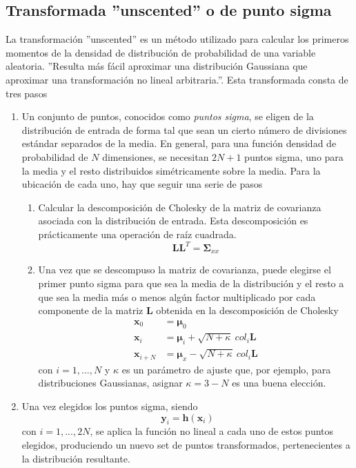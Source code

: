 \subsection{Transformada ''unscented'' o de punto sigma}
La transformación ''unscented''\cite{julier2000}\cite{wan2000} es un método utilizado para calcular los primeros momentos de la densidad de distribución de probabilidad de una variable aleatoria. ''Resulta más fácil aproximar una distribución Gaussiana que aproximar una transformación no lineal arbitraria.''\cite{uhlmann1994}. Esta transformada consta de tres pasos
\begin{enumerate}
    \item Un conjunto de puntos, conocidos como \textit{puntos sigma}, se eligen de la distribución de entrada de forma tal que sean un cierto número de divisiones estándar separados de la media. En general, para una función densidad de probabilidad de $N$ dimensiones, se necesitan $2N + 1$ puntos sigma, uno para la media y el resto distribuidos simétricamente sobre la media. Para la ubicación de cada uno, hay que seguir una serie de pasos
    \begin{enumerate}
        \item Calcular la descomposición de Cholesky de la matriz de covarianza asociada con la distribución de entrada. Esta descomposición es prácticamente una operación de raíz cuadrada.
        \begin{equation}
            \bm{L}\bm{L}^T = \bm{\Sigma}_{xx}
        \end{equation}
        \item Una vez que se descompuso la matriz de covarianza, puede elegirse el primer punto sigma para que sea la media de la distribución y el resto a que sea la media más o menos algún factor multiplicado por cada componente de la matriz $\bm{L}$ obtenida en la descomposición de Cholesky
        \begin{align}
            \bm{x}_0 &= \bm{\mu}_0 \\
            \bm{x}_i &= \bm{\mu}_i + \sqrt{N+\kappa}\ col_i\bm{L} \\
            \bm{x}_{i+N} &= \bm{\mu}_x - \sqrt{N+\kappa}\ col_i\bm{L}
        \end{align}
        con $i = 1, ..., N$ y $\kappa$ es un parámetro de ajuste que, por ejemplo, para distribuciones Gaussianas, asignar $\kappa = 3 - N$ es una buena elección.
    \end{enumerate}
    \item Una vez elegidos los puntos sigma, siendo
    \begin{equation}
        \bm{y}_i = \bm{h}(\bm{x}_i)
    \end{equation}
    con $i = 1, ..., 2N$, se aplica la función no lineal a cada uno de estos puntos elegidos, produciendo un nuevo set de puntos transformados, pertenecientes a la distribución resultante.
    

\end{enumerate}
